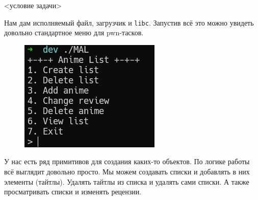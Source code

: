 \documentclass[idxtotoc,hyperref,openany,oneside]{files/pwn} %
\begin{document}
\begin{tcolorbox}
<условие задачи>
\end{tcolorbox}

Нам дам исполняемый файл, загрузчик и \verb|libc|. Запустив всё это можно увидеть довольно стандартное меню для pwn-тасков.
\begin{figure}[H]
\begin{center}
\includegraphics[width=1.0\linewidth]{files/mal-menu}
\end{center}
\label{fig:mal-menu}
\end{figure}

У нас есть ряд примитивов для создания каких-то объектов. По логике работы всё выглядит довольно просто. Мы можем создавать списки и добавлять в них элементы (тайтлы). Удалять тайтлы из списка и удалять сами списки. А также просматривать списки и изменять рецензии.
\end{document}
